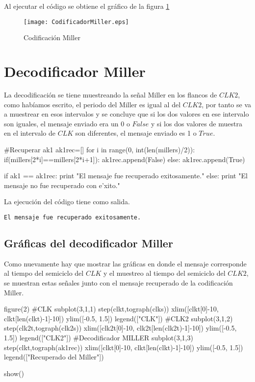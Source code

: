 \documentclass{article}
\begin{document}
Al ejecutar el código se obtiene el gráfico de la figura \ref{fig:codificadormiller}

\begin{figure}
  \centering
    \texttt{[image: CodificadorMiller.eps]}
  \caption{Codificación Miller}
  \label{fig:codificadormiller}
\end{figure}

\section {Decodificador Miller}

La decodificación se tiene muestreando la señal Miller en los flancos de $CLK2$, como habíamos escrito, el periodo del Miller es igual al del $CLK2$, por tanto se va a muestrear en esos intervalos y se concluye que si los dos valores en ese intervalo son iguales, el mensaje enviado era un 0 o $False$ y si los dos valores de muestra en el intervalo de $CLK$ son diferentes, el mensaje enviado es 1 o $True$.

\begin{python}
#Recuperar ak1
ak1rec=[]
for i in range(0, int(len(millers)/2)):
    if(millers[2*i]==millers[2*i+1]):
        ak1rec.append(False)
    else:
        ak1rec.append(True)

if ak1 == ak1rec:
    print "El mensaje fue recuperado exitosamente."      
else:
    print "El mensaje no fue recuperado con e'xito."
\end{python}

La ejecución del código tiene como salida.

\begin{verbatim}
El mensaje fue recuperado exitosamente.
\end{verbatim}

\subsection {Gráficas del decodificador Miller}

Como nuevamente hay que mostrar las gráficas en donde el mensaje corresponde al tiempo del semiciclo del $CLK$ y el muestreo al tiempo del semiciclo del $CLK2$, se muestran estas señales junto con el mensaje recuperado de la codificación Miller.

\begin{python}
figure(2) 
#CLK
subplot(3,1,1)
step(clkt,tograph(clks))
xlim([clkt[0]-10, clkt[len(clkt)-1]-10])
ylim([-0.5, 1.5])
legend(["CLK"])
#CLK2
subplot(3,1,2)
step(clk2t,tograph(clk2s))
xlim([clk2t[0]-10, clk2t[len(clk2t)-1]-10])
ylim([-0.5, 1.5])
legend(["CLK2"])
#Decodificador MILLER  
subplot(3,1,3)
step(clkt,tograph(ak1rec))
xlim([clkt[0]-10, clkt[len(clkt)-1]-10])
ylim([-0.5, 1.5])
legend(["Recuperado del Miller"])

show()
\end{python}
\end{document}
